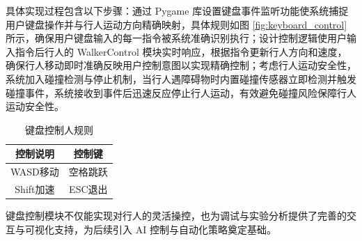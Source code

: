 具体实现过程包含以下步骤：通过 Pygame 库设置键盘事件监听功能使系统捕捉用户键盘操作并与行人运动方向精确映射，具体规则如图 \ref{fig:keyboard_control}所示，确保用户键盘输入的每一指令被系统准确识别执行；设计控制逻辑使用户输入指令后行人的 WalkerControl 模块实时响应，根据指令更新行人方向和速度，确保行人移动即时准确反映用户控制意图以实现精确控制；考虑行人运动安全性，系统加入碰撞检测与停止机制，当行人遇障碍物时内置碰撞传感器立即检测并触发碰撞事件，系统接收到事件后迅速反应停止行人运动，有效避免碰撞风险保障行人运动安全性。

\begin{table}[H]
    \centering
    \begin{tabular}{|c|c|}
    \hline
    控制说明 & 控制键 \\
    \hline
    WASD移动 & 空格跳跃 \\
    \hline
    Shift加速 & ESC退出 \\
    \hline
    \end{tabular}
    \caption{键盘控制人规则}
\end{table}

键盘控制模块不仅能实现对行人的灵活操控，也为调试与实验分析提供了完善的交互与可视化支持，为后续引入 AI 控制与自动化策略奠定基础。

